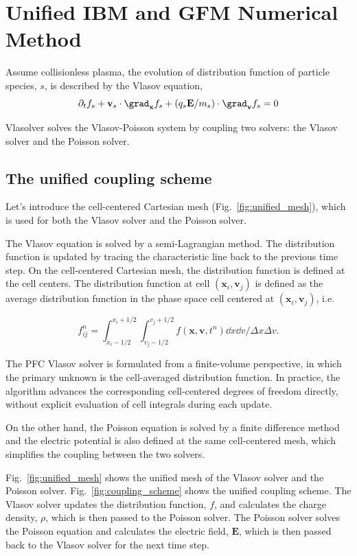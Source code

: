\section{Unified IBM and GFM Numerical Method}
Assume collisionless plasma, the evolution of distribution function of particle species, $s$, is described by the Vlasov equation,
\begin{equation}
	\label{eq:vlasov}
	\partial_t f_s + \mathbf{v}_s\cdot\grad_{\mathbf{x}} f_s + (q_s\mathbf{E}/m_s)\cdot\grad_{\mathbf{v}} f_s = 0
\end{equation}

Vlasolver solves the Vlasov-Poisson system by coupling two solvers: the Vlasov solver and the Poisson solver.

\subsection{The unified coupling scheme}
Let's introduce the cell-centered Cartesian mesh (Fig.~\ref{fig:unified_mesh}), which is used for both the Vlasov solver and the Poisson solver.

The Vlasov equation is solved by a semi-Lagrangian method. The distribution function is updated by tracing the characteristic line back to the previous time step. On the cell-centered Cartesian mesh, the distribution function is defined at the cell centers. The distribution function at cell $(\mathbf{x}_i, \mathbf{v}_j)$ is defined as the average distribution function in the phase space cell centered at $(\mathbf{x}_i, \mathbf{v}_j)$, i.e.

\begin{equation}
	f_{ij}^n = \int_{x_i-1/2}^{x_i+1/2}\int_{v_j-1/2}^{v_j+1/2} f(\mathbf{x}, \mathbf{v}, t^n)\dd x\dd v/\Delta x\Delta v.
	\label{eq:distribution_function_definition}
\end{equation}

The PFC Vlasov solver is formulated from a finite-volume perspective, in which the primary unknown is the cell-averaged distribution function. In practice, the algorithm advances the corresponding cell-centered degrees of freedom directly, without explicit evaluation of cell integrals during each update.

On the other hand, the Poisson equation is solved by a finite difference method and the electric potential is also defined at the same cell-centered mesh, which simplifies the coupling between the two solvers.

Fig.~\ref{fig:unified_mesh} shows the unified mesh of the Vlasov solver and the Poisson solver. Fig.~\ref{fig:coupling_scheme} shows the unified coupling scheme. The Vlasov solver updates the distribution function, $f$, and calculates the charge density, $\rho$, which is then passed to the Poisson solver. The Poisson solver solves the Poisson equation and calculates the electric field, $\mathbf{E}$, which is then passed back to the Vlasov solver for the next time step.



